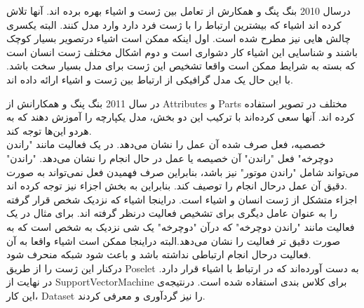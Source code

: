 درسال 2010 بنگ پنگ و همکارش %
\cite{ModelingMutual_OB_POSE}
از تعامل بین ژست و اشیاء بهره برده اند. آنها تلاش کرده اند اشیاء که بیشترین ارتباط را با ژست فرد دارد وارد مدل کنند. البته یکسری چالش هایی نیز مطرح شده است. اول اینکه ممکن است اشیاء درتصویر بسیار کوچک باشند و شناسایی این اشیاء کار دشواری است و دوم اشکال مختلف ژست انسان است که بسته به شرایط ممکن است واقعا تشخیص این ژست برای مدل بسیار سخت باشد. با این حال یک مدل گرافیکی از ارتباط بین ژست و اشیاء ارائه داده اند.

در سال 2011 بنگ پنگ و همکارانش %
\cite{HAR_learing_action_part}
از %
\gls{Attributes}
 و %
\gls{Parts}
 مختلف در تصویر استفاده کرده اند. آنها سعی کرده‌اند با ترکیب این دو بخش، مدل یکپارچه را آموزش دهند که به هردو این‌ها توجه کند.\\
 خصصیه، فعل صرف شده آن عمل را نشان می‌دهد. در یک فعالیت مانند "راندن دوچرخه" فعل "راندن" آن خصیصه یا عمل در حال انجام را نشان می‌دهد. "راندن" می‌تواند شامل "راندن موتور" نیز باشد،‌ بنابراین صرف فهمیدن فعل نمی‌تواند به صورت دقیق آن عمل درحال انجام را توصیف کند. بنابراین به بخش اجزاء نیز توجه کرده اند.\\
 اجزاء متشکل از ژست انسان و اشیاء است. دراینجا اشیاء که نزدیک شخص قرار گرفته را به عنوان عامل دیگری برای تشخیص فعالیت درنظر گرفته اند. برای مثال در یک فعالیت مانند "راندن دوچرخه" که درآن "دوچرخه" یک شی نزدیک به شخص است که به صورت دقیق تر فعالیت را نشان می‌دهد.البته دراینجا ممکن است اشیاء واقعا به آن فعالیت درحال انجام ارتباطی نداشته باشد و باعث شود شبکه منحرف شود.\\
 درکنار این ژست را از طریق Poselet%
  به دست آورده‌اند که در ارتباط با اشیاء قرار دارد. در نهایت از %
\gls{SupportVectorMachine}
 برای کلاس بندی استفاده شده است. درنتیجه‌ی این کار، %
\gls{Dataset}
 را نیز گردآوری و معرفی کردند.
 
